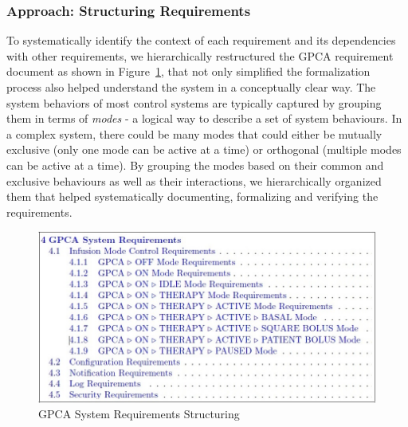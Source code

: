 \subsubsection {Approach: Structuring Requirements}

To systematically identify the context of each requirement and its dependencies with other requirements, we hierarchically restructured the GPCA requirement document as shown in Figure~\ref{fig:gpca-requirements}, that not only simplified the formalization process also helped understand the system in a conceptually clear way. The system behaviors of most control systems are typically captured by grouping them in terms of \emph{modes} - a logical way to describe a set of system behaviours. In a complex system, there could be many modes that could either be mutually exclusive (only one mode can be active at a time) or orthogonal (multiple modes can be active at a time). By grouping the modes based on their common and exclusive behaviours as well as their interactions, we hierarchically organized them that helped systematically documenting, formalizing and verifying the requirements.

 \begin{figure}[h!]
    \centering
    \includegraphics[width=\columnwidth]{images/structuring.jpg}
    \caption{GPCA System Requirements Structuring}
    \label{fig:gpca-requirements}
 \end{figure}

